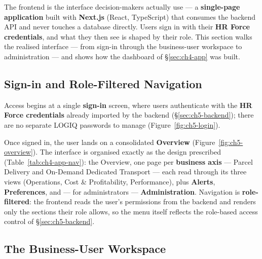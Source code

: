The frontend is the interface decision-makers actually use --- a \textbf{single-page application} built
with \textbf{Next.js} (React, TypeScript) that consumes the backend API and never touches a database
directly. Users sign in with their \textbf{HR Force credentials}, and what they then see is shaped by
their role. This section walks the realised interface --- from sign-in through the business-user
workspace to administration --- and shows how the dashboard of \S\ref{sec:ch4-app} was built.

\subsection{Sign-in and Role-Filtered Navigation}

Access begins at a single \textbf{sign-in} screen, where users authenticate with the \textbf{HR Force
credentials} already imported by the backend (\S\ref{sec:ch5-backend}); there are no separate LOGIQ
passwords to manage (Figure~\ref{fig:ch5-login}).


Once signed in, the user lands on a consolidated \textbf{Overview} (Figure~\ref{fig:ch5-overview}). The
interface is organised exactly as the design prescribed (Table~\ref{tab:ch4-app-nav}): the Overview, one
page per \textbf{business axis} --- Parcel Delivery and On-Demand Dedicated Transport --- each read through its
three views (Operations, Cost \& Profitability, Performance), plus \textbf{Alerts}, \textbf{Preferences},
and --- for administrators --- \textbf{Administration}. Navigation is \textbf{role-filtered}: the
frontend reads the user's permissions from the backend and renders only the sections their role allows,
so the menu itself reflects the role-based access control of \S\ref{sec:ch5-backend}.


\subsection{The Business-User Workspace}

